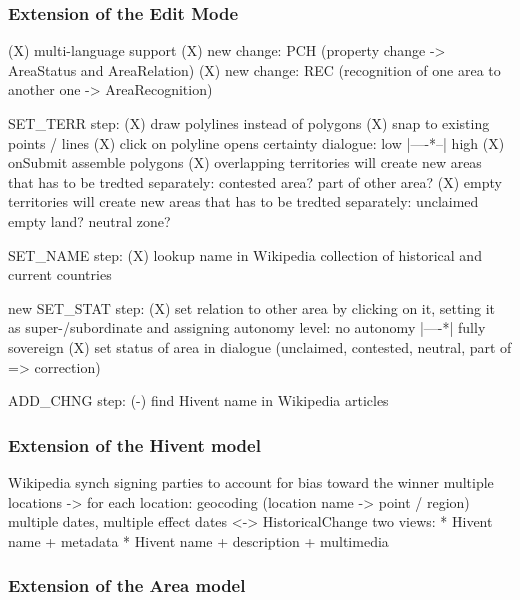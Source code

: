 \subsubsection{Extension of the Edit Mode} %
\label{ssub:extension_of_the_edit_mode}

(X) multi-language support
(X) new change: PCH (property change -> AreaStatus and AreaRelation)
(X) new change: REC (recognition of one area to another one -> AreaRecognition)

SET\_TERR step:
(X) draw polylines instead of polygons
(X) snap to existing points / lines
(X) click on polyline opens certainty dialogue: low |----*--| high
(X) onSubmit assemble polygons
(X) overlapping territories will create new areas that has to be tredted separately:
  contested area? part of other area?
(X) empty territories will create new areas that has to be tredted separately:
  unclaimed empty land? neutral zone?

SET\_NAME step:
(X) lookup name in Wikipedia collection of historical and current countries

new SET\_STAT step:
(X) set relation to other area by clicking on it, setting it as super-/subordinate and assigning autonomy level:
no autonomy |----*| fully sovereign
(X) set status of area in dialogue (unclaimed, contested, neutral, part of => correction)


ADD\_CHNG step:
(-) find Hivent name in Wikipedia articles



\subsubsection{Extension of the Hivent model} %
\label{ssub:extension_of_the_hivent_model}

Wikipedia synch
signing parties to account for bias toward the winner
multiple locations
-> for each location: geocoding (location name -> point / region)
multiple dates, multiple effect dates <-> HistoricalChange
two views:
* Hivent name + metadata
* Hivent name + description + multimedia



\subsubsection{Extension of the Area model} %
\label{ssub:extension_of_the_area_model}

